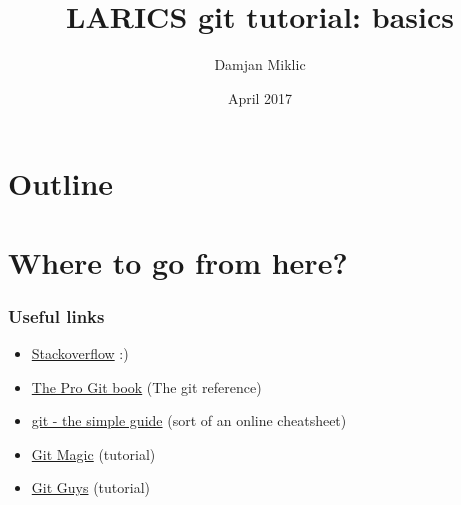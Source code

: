 \documentclass{beamer}%
\title[git basics]
{LARICS git tutorial: basics}
\author[Miklic]{Damjan Miklic}
\institute[LARICS]{LARICS Lab\\FER, University of Zagreb}
\date[]{April 2017}
\begin{document}

\begin{frame}
	\titlepage
\end{frame}


\section*{Outline}
\begin {frame}
	\tableofcontents
\end{frame}












\section{Where to go from here?}

\begin{frame}
	\frametitle{Useful links}
	
	\begin{itemize}
		\item \href{http://stackoverflow.com/questions/tagged/git}{Stackoverflow} :)
		\item \href{https://git-scm.com/book/en/v2}{The Pro Git book} (The git reference)
		\item \href{http://rogerdudler.github.io/git-guide/}{git - the simple guide} (sort of an online cheatsheet)
		\item \href{http://www-cs-students.stanford.edu/~blynn/gitmagic/}{Git Magic} (tutorial) 
		\item \href{http://www.gitguys.com/}{Git Guys} (tutorial)
	\end{itemize}
	
\end{frame}
\end{document}
